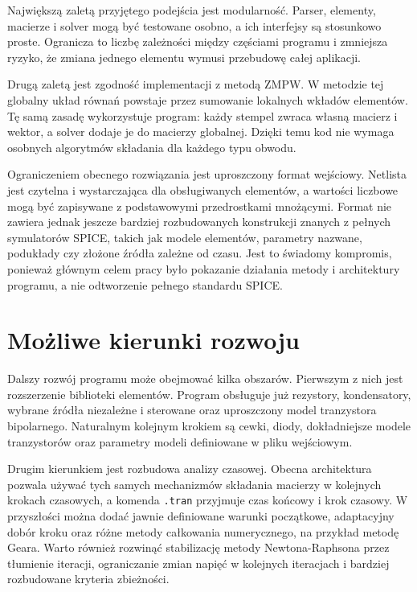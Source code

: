 Największą zaletą przyjętego podejścia jest modularność. Parser, elementy, macierze i solver mogą być testowane osobno, a ich interfejsy są stosunkowo proste. Ogranicza to liczbę zależności między częściami programu i zmniejsza ryzyko, że zmiana jednego elementu wymusi przebudowę całej aplikacji.

Drugą zaletą jest zgodność implementacji z metodą ZMPW. W metodzie tej globalny układ równań powstaje przez sumowanie lokalnych wkładów elementów. Tę samą zasadę wykorzystuje program: każdy stempel zwraca własną macierz i wektor, a solver dodaje je do macierzy globalnej. Dzięki temu kod nie wymaga osobnych algorytmów składania dla każdego typu obwodu.

Ograniczeniem obecnego rozwiązania jest uproszczony format wejściowy. Netlista jest czytelna i wystarczająca dla obsługiwanych elementów, a wartości liczbowe mogą być zapisywane z podstawowymi przedrostkami mnożącymi. Format nie zawiera jednak jeszcze bardziej rozbudowanych konstrukcji znanych z pełnych symulatorów SPICE, takich jak modele elementów, parametry nazwane, podukłady czy złożone źródła zależne od czasu. Jest to świadomy kompromis, ponieważ głównym celem pracy było pokazanie działania metody i architektury programu, a nie odtworzenie pełnego standardu SPICE.

\section{Możliwe kierunki rozwoju}
\label{sec:kierunki-rozwoju}

Dalszy rozwój programu może obejmować kilka obszarów. Pierwszym z nich jest rozszerzenie biblioteki elementów. Program obsługuje już rezystory, kondensatory, wybrane źródła niezależne i sterowane oraz uproszczony model tranzystora bipolarnego. Naturalnym kolejnym krokiem są cewki, diody, dokładniejsze modele tranzystorów oraz parametry modeli definiowane w pliku wejściowym.

Drugim kierunkiem jest rozbudowa analizy czasowej. Obecna architektura pozwala używać tych samych mechanizmów składania macierzy w kolejnych krokach czasowych, a komenda \texttt{.tran} przyjmuje czas końcowy i krok czasowy. W przyszłości można dodać jawnie definiowane warunki początkowe, adaptacyjny dobór kroku oraz różne metody całkowania numerycznego, na przykład metodę Geara. Warto również rozwinąć stabilizację metody Newtona-Raphsona przez tłumienie iteracji, ograniczanie zmian napięć w kolejnych iteracjach i bardziej rozbudowane kryteria zbieżności.

